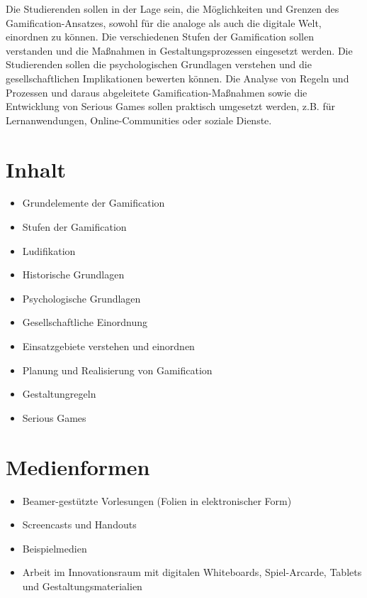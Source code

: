 Die Studierenden sollen in der Lage sein, die Möglichkeiten und Grenzen
des Gamification-Ansatzes, sowohl für die analoge als auch die digitale
Welt, einordnen zu können. Die verschiedenen Stufen der Gamification
sollen verstanden und die Maßnahmen in Gestaltungsprozessen eingesetzt
werden. Die Studierenden sollen die psychologischen Grundlagen verstehen
und die gesellschaftlichen Implikationen bewerten können. Die Analyse
von Regeln und Prozessen und daraus abgeleitete Gamification-Maßnahmen
sowie die Entwicklung von Serious Games sollen praktisch umgesetzt
werden, z.B. für Lernanwendungen, Online-Communities oder soziale
Dienste.

\hypertarget{inhaltpathlabelmi-2017modulbeschreibungen-bachelorba_sc_gamification}{%
\section*{Inhalt\label{/mi-2017/modulbeschreibungen-bachelor/BA_SC_gamification}}\label{inhaltpathlabelmi-2017modulbeschreibungen-bachelorba_sc_gamification}}

\begin{itemize}
\tightlist
\item
  Grundelemente der Gamification
\item
  Stufen der Gamification
\item
  Ludifikation
\item
  Historische Grundlagen
\item
  Psychologische Grundlagen
\item
  Gesellschaftliche Einordnung
\item
  Einsatzgebiete verstehen und einordnen
\item
  Planung und Realisierung von Gamification
\item
  Gestaltungregeln
\item
  Serious Games
\end{itemize}

\hypertarget{medienformenpathlabelmi-2017modulbeschreibungen-bachelorba_sc_gamification}{%
\section*{Medienformen\label{/mi-2017/modulbeschreibungen-bachelor/BA_SC_gamification}}\label{medienformenpathlabelmi-2017modulbeschreibungen-bachelorba_sc_gamification}}

\begin{itemize}
\tightlist
\item
  Beamer-gestützte Vorlesungen (Folien in elektronischer Form)
\item
  Screencasts und Handouts
\item
  Beispielmedien
\item
  Arbeit im Innovationsraum mit digitalen Whiteboards, Spiel-Arcarde,
  Tablets und Gestaltungsmaterialien
\end{itemize}

